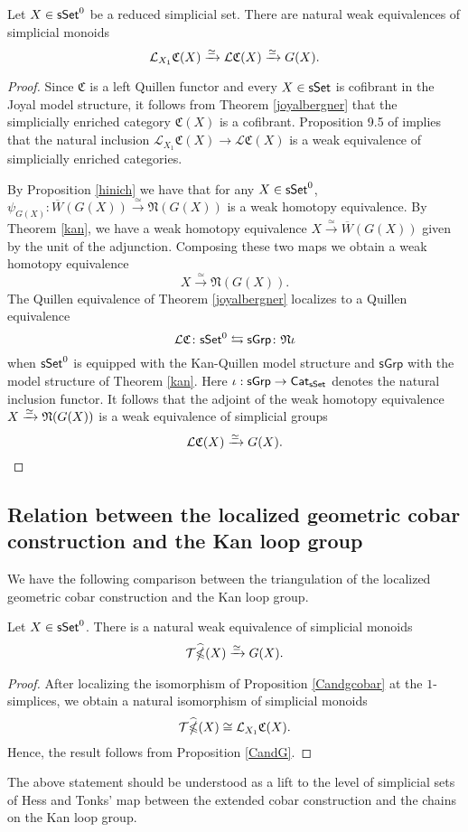 \begin{proposition}\label{CandG} Let $X \in \mathsf{sSet}^0$ be a reduced simplicial set. There are natural weak equivalences of simplicial monoids
$$\mathcal{L}_{X_1} \mathfrak{C}(X) \xrightarrow{\simeq} \mathcal{L}\mathfrak{C}(X) \xrightarrow{\simeq} G(X).$$
\end{proposition}

\begin{proof}
Since $\mathfrak{C}$ is a left Quillen functor and every $X \in \mathsf{sSet}$ is cofibrant in the Joyal model structure, it follows from Theorem \ref{joyalbergner} that the simplicially enriched category $\mathfrak{C}(X)$ is a cofibrant. Proposition 9.5 of \cite{dwyer1980simplicial} implies that the natural inclusion $\mathcal{L}_{X_1} \mathfrak{C}(X) \to \mathcal{L}\mathfrak{C}(X)$ is a weak equivalence of simplicially enriched categories. 

By Proposition \ref{hinich} we have that for any $X \in \mathsf{sSet}^0$, $\psi_{G(X)}: \overline{W}(G(X)) \xrightarrow{\simeq} \mathfrak{N}(G(X))$ is a weak homotopy equivalence. By Theorem \ref{kan}, we have a weak homotopy equivalence $X \xrightarrow{\simeq} \overline{W}(G(X))$ given by the unit of the adjunction. Composing these two maps we obtain a weak homotopy equivalence
$$X \xrightarrow{\simeq} \mathfrak{N}(G(X)).$$ 
The Quillen equivalence of Theorem \ref{joyalbergner} localizes to a Quillen equivalence
$$\mathcal{L} \mathfrak{C} \colon \mathsf{sSet}^0 \leftrightarrows \mathsf{sGrp} \colon \mathfrak{N}\iota$$
when $\mathsf{sSet}^0$ is equipped with the Kan-Quillen model structure and $\mathsf{sGrp}$ with the model structure of Theorem \ref{kan}. Here $\iota: \mathsf{sGrp} \to \mathsf{Cat}_{\mathsf{sSet}}$ denotes the natural inclusion functor. It follows that the adjoint of the weak homotopy equivalence $X \xrightarrow{\simeq} \mathfrak{N}(G(X))$ is a weak equivalence of simplicial groups
$$\mathcal{L}\mathfrak{C}(X) \xrightarrow{\simeq} G(X).$$ 
\end{proof}


\subsection{Relation between the localized geometric cobar construction and the Kan loop group}

We have the following comparison between the triangulation of the localized geometric cobar construction and the Kan loop group. 
\begin{corollary}\label{widehatgcobarandG} Let $X \in \mathsf{sSet}^0$. There is a natural weak equivalence of simplicial monoids
$$\mathcal{T} \widehat{\operatorname{\mathbb{\Omega}}}(X) \xrightarrow{\simeq}G(X).$$
\end{corollary}
\begin{proof} After localizing the isomorphism of Proposition \ref{Candgcobar} at the $1$-simplices, we obtain a natural isomorphism of simplicial monoids $$\mathcal{T} \widehat{\operatorname{\mathbb{\Omega}}}(X) \cong \mathcal{L}_{X_1}\mathfrak{C}(X).$$ Hence, the result follows from Proposition \ref{CandG}. 
\end{proof}
The above statement should be understood as a lift to the level of simplicial sets of Hess and Tonks' map between the extended cobar construction and the chains on the Kan loop group.

